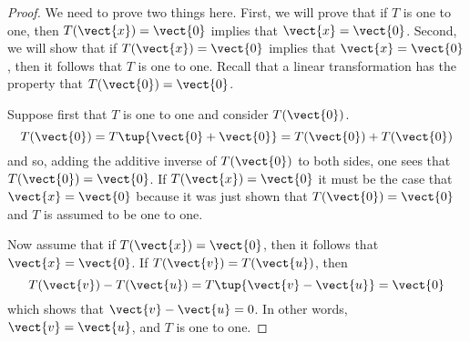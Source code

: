 \begin{proof}
We need to prove two things here. First, we will prove that if $T$ is one to one, then 
$T(\vect{x}) = \vect{0}$ implies that $\vect{x}=\vect{0}$. Second, we will show that if $T(\vect{x})=\vect{0}$ implies that $\vect{x}=\vect{0}$, then 
it follows that $T$ is one to one. Recall that a linear transformation has the property that $T(\vect{0}) = \vect{0}$. 


Suppose first that $T$ is one to one and consider $T(\vect{0})$. 
\begin{equation*}
T(\vect{0})=T\tup{\vect{0}+\vect{0}} =T(\vect{0})+T(\vect{0})
\end{equation*}
and so, adding the additive inverse of $T(\vect{0})$ to both sides, one sees
that $T(\vect{0})=\vect{0}$. If $T(\vect{x})=\vect{0}$ it must be the
case that $\vect{x}=\vect{0}$ because it was just shown that $T(\vect{0})=\vect{0}$ and $T$ is assumed to be one to one. 

Now assume that if $T(\vect{x})=\vect{0}$, then it follows that $\vect{x}=\vect{0}$. If $T(\vect{v})=T(\vect{u})$, then 
\[
T(\vect{v})-T(\vect{u})=T\tup{\vect{v}-\vect{u}} =\vect{0}
\]
which shows that $\vect{v}-\vect{u}=0$. In other words, $\vect{v}=\vect{u}$, and $T$ is one to one. 
\end{proof}

